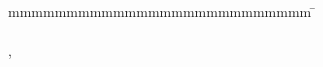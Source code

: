 \begin{titlepage}
\begin{center}
		\vspace*{3mm}		{\textbf \abschluss}\\
		\vspace*{12mm}	\langartikelstudiengang{} \langstudiengang{} \studiengang\\
    \vspace*{3mm}		\langanderdh{} \dhbw\\
		\vspace*{12mm}	\langvon\\
		\vspace*{3mm}		{\large\textbf \autor}\\
		\vspace*{12mm}	\datumAbgabe\\
	\end{center}
	\vfill
	\begin{spacing}{1.2}
	\begin{tabbing}
		mmmmmmmmmmmmmmmmmmmmmmmmmm             \= \kill
		\textbf{\langdbbearbeitungszeit}       \>  \zeitraum\\
		\textbf{\langdbkurs}  \>  \kurs\\
		\textbf{\langdbfirma}                  \>  \firma, \firmenort\\
		\textbf{\langdbbetreuer}               \>  \betreuer\\
		\ifreviewer
			\textbf{\langdbgutachter}              \>  \gutachter\\
		\fi
	\end{tabbing}
	\end{spacing}
\end{titlepage}
